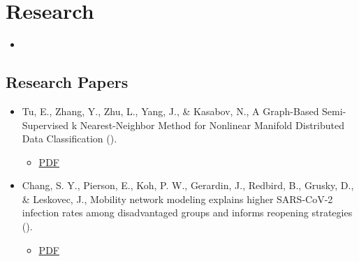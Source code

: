 \documentclass[a4paper,11pt,twoside]{article}
\begin{document}
\section{Research}
\label{sec:orgf25ebac}
\begin{itemize}
\item 
\end{itemize}



\subsection{Research Papers}
\label{sec:org9b366ad}

\begin{itemize}
\item Tu, E., Zhang, Y., Zhu, L., Yang, J., \& Kasabov, N., A Graph-Based Semi-Supervised k Nearest-Neighbor Method for Nonlinear Manifold Distributed Data Classification (). \cite{tuGraphBasedSemiSupervisedNearestNeighbor2016a}
\begin{itemize}
\item \href{file:///home/ryan/Sync/Studies/2020ResearchTraining/spectral\_analysis\_graphs/attachments/research/Enmei\_Tu\_Semi\_Supervised.pdf}{PDF}
\end{itemize}
\item Chang, S. Y., Pierson, E., Koh, P. W., Gerardin, J., Redbird, B., Grusky, D., \& Leskovec, J., Mobility network modeling explains higher SARS-CoV-2 infection rates among disadvantaged groups and informs reopening strategies (). \cite{changMobilityNetworkModeling2020}
\begin{itemize}
\item \href{file:///home/ryan/Sync/Studies/2020ResearchTraining/spectral\_analysis\_graphs/attachments/research/Serina\_Chang\_Mobility\_Networks.pdf}{PDF}
\end{itemize}
\end{itemize}
\end{document}
